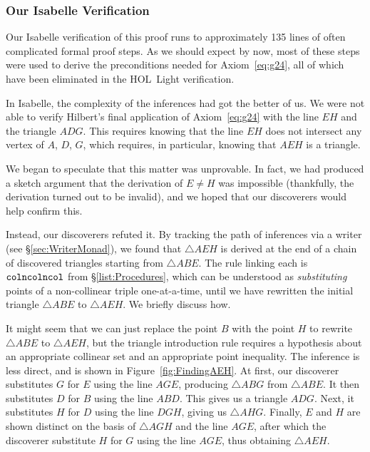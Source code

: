 \subsubsection{Our Isabelle Verification}
Our Isabelle verification of this proof runs to approximately 135 lines of often complicated formal proof steps. As we should expect by now, most of these steps were used to derive the preconditions needed for Axiom~\ref{eq:g24}, all of which have been eliminated in the HOL~Light verification. 

In Isabelle, the complexity of the inferences had got the better of us. We were not able to verify Hilbert's final application of Axiom~\ref{eq:g24} with the line $EH$ and the triangle $ADG$. This requires knowing that the line $EH$ does not intersect any vertex of $A$, $D$, $G$, which requires, in particular, knowing that $AEH$ is a triangle.

We began to speculate that this matter was unprovable. In fact, we had produced a sketch argument that the derivation of $E\neq H$ was impossible (thankfully, the derivation turned out to be invalid), and we hoped that our discoverers would help confirm this.

\label{sec:CombinatoryError}Instead, our discoverers refuted it. By tracking the path of inferences via a writer (see \S\ref{sec:WriterMonad}), we found that $\triangle AEH$ is derived at the end of a chain of discovered triangles starting from $\triangle ABE$. The rule linking each is $\texttt{colncolncol}$ from \S\ref{list:Procedures}, which can be understood as \emph{substituting} points of a non-collinear triple one-at-a-time, until we have rewritten the initial triangle $\triangle ABE$ to $\triangle AEH$. We briefly discuss how.

It might seem that we can just replace the point $B$ with the point $H$ to rewrite $\triangle ABE$ to $\triangle AEH$, but the triangle introduction rule requires a hypothesis about an appropriate collinear set and an appropriate point inequality. The inference is less direct, and is shown in Figure~\ref{fig:FindingAEH}. At first, our discoverer substitutes $G$ for $E$ using the line $AGE$, producing $\triangle ABG$ from $\triangle ABE$. It then substitutes $D$ for $B$ using the line $ABD$. This gives us a triangle $ADG$. Next, it substitutes $H$ for $D$ using the line $DGH$, giving us $\triangle AHG$. Finally, $E$ and $H$ are shown distinct on the basis of $\triangle AGH$ and the line $AGE$, after which the discoverer substitute $H$ for $G$ using the line $AGE$, thus obtaining $\triangle AEH$.

